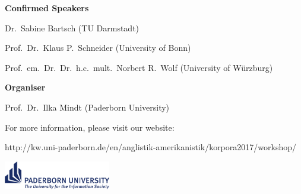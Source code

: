 \documentclass[12pt]{article}
\begin{document}
\begin{titlepage}
{	{\fontsize{1.2cm}{0cm}\selectfont\textbf{Confirmed Speakers}\par}
	{\huge Dr.~Sabine Bartsch (TU Darmstadt)\par	
	Prof.~Dr.~Klaus P.~Schneider (University of Bonn)\par
	Prof.~em.~Dr.~Dr.~h.c.~mult.~Norbert R.~Wolf (University of W\"{u}rzburg)\par}
		\vfill
	{\huge\textbf{Organiser}\par}
	{\huge Prof.~Dr.~Ilka Mindt (Paderborn University)\par}
		\vfill
	{\huge For more information, please visit our website:\par}
	{\LARGE http://kw.uni-paderborn.de/en/anglistik-amerikanistik/korpora2017/workshop/\par}
	}
	
		\vspace{2cm}
		
		\mbox{\hspace{0.705\textwidth}\includegraphics[width=0.35\textwidth]{UPB_LOGO_GB_CMYK_15.pdf}}

\end{titlepage}
\end{document}

